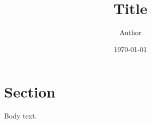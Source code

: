 \documentclass[11pt,a4paper]{article}
\title{Title}
\author{Author}
\date{\today}
\begin{document}
\maketitle

\section{Section}
Body text.


% 
% 
\end{document}
